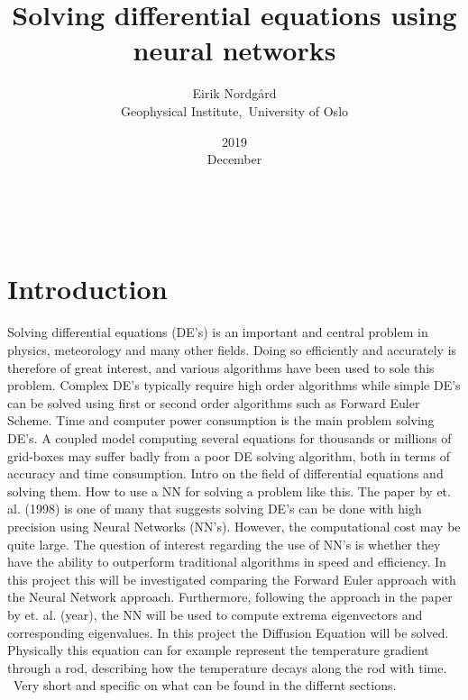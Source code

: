 \documentclass[a4paper,11pt,twocolumn]{article}
\begin{document}
\title{Solving differential equations using neural networks}
\date{2019\\ December}
\author{Eirik Nordgård\\ Geophysical Institute,\ University of Oslo}


\
\section{Introduction}

Solving differential equations (DE's) is an important and central problem in physics, meteorology and many other fields. Doing so efficiently and accurately is therefore of great interest, and various algorithms have been used to sole this problem. Complex DE's typically require high order algorithms while simple DE's can be solved using first or second order algorithms such as Forward Euler Scheme. Time and computer power consumption is the main problem solving DE's. A coupled model computing several equations for thousands or millions of grid-boxes may suffer badly from a poor DE solving algorithm, both in terms of accuracy and time consumption.  
Intro on the field of differential equations and solving them. How to use a NN for solving a problem like this. The paper by \cite{lagaris} et. al. (1998) is one of many that suggests solving DE's can be done with high precision using Neural Networks (NN's). However, the computational cost may be quite large. 
The question of interest regarding the use of NN's is whether they have the ability to outperform traditional algorithms in speed and efficiency. In this project this will be investigated comparing the Forward Euler approach with the Neural Network approach. Furthermore, following the approach in the paper by \cite{yi} et. al. (year), the NN will be used to compute extrema eigenvectors and corresponding eigenvalues. In this project the Diffusion Equation will be solved. Physically this equation can for example represent the temperature gradient through a rod, describing how the temperature decays along the rod with time.  
\
Very short and specific on what can be found in the differnt sections. 
\
\end{document}
